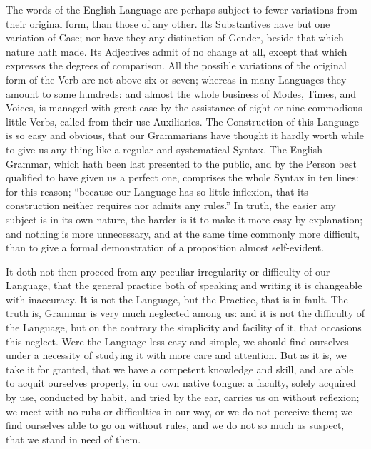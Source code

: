 The words of the English Language are perhaps subject to fewer
variations from their original form, than those of any other. Its
Substantives have but one variation of Case; nor have they any
distinction of Gender, beside that which nature hath made. Its
Adjectives admit of no change at all, except that which expresses the
degrees of comparison. All the possible variations of the original form
of the Verb are not above six or seven; whereas in many Languages they
amount to some hundreds: and almost the whole business of Modes, Times,
and Voices, is managed with great ease by the assistance of eight or
nine commodious little Verbs, called from their use Auxiliaries. The
Construction of this Language is so easy and obvious, that our
Grammarians have thought it hardly worth while to give us any thing like
a regular and systematical Syntax. The English Grammar, which hath been
last presented to the public, and by the Person best qualified to have
given us a perfect one, comprises the whole Syntax in ten lines: for
this reason; ``because our Language has so little inflexion, that its
construction neither requires nor admits any rules.'' In truth, the
easier any subject is in its own nature, the harder is it to make it
more easy by explanation; and nothing is more unnecessary, and at the
same time commonly more difficult, than to give a formal demonstration
of a proposition almost self-evident.

It doth not then proceed from any peculiar irregularity or difficulty of
our Language, that the general practice both of speaking and writing it
is changeable with inaccuracy. It is not the Language, but the Practice,
that is in fault. The truth is, Grammar is very much neglected among us:
and it is not the difficulty of the Language, but on the contrary the
simplicity and facility of it, that occasions this neglect. Were the
Language less easy and simple, we should find ourselves under a
necessity of studying it with more care and attention. But as it is, we
take it for granted, that we have a competent knowledge and skill, and
are able to acquit ourselves properly, in our own native tongue: a
faculty, solely acquired by use, conducted by habit, and tried by the
ear, carries us on without reflexion; we meet with no rubs or
difficulties in our way, or we do not perceive them; we find ourselves
able to go on without rules, and we do not so much as suspect, that we
stand in need of them.

